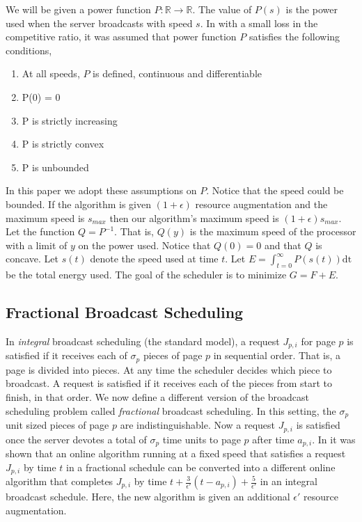 \documentclass[11pt]{article}
\newcommand{\eps}{\epsilon}
\newcommand{\dt}{\mathrm{dt}}
\begin{document}
We will be given a power function $P: \mathbb{R} \rightarrow \mathbb{R}$.  The value of $P(s)$ is the power used when the server broadcasts with speed $s$.  In \cite{BansalCP09,GuptaKP10} with a small loss in the competitive ratio, it was assumed that power function $P$ satisfies the following conditions,

\begin{enumerate}
\item At all speeds, $P$ is defined, continuous and differentiable

\item  P(0) = 0

\item P is strictly increasing

\item P is strictly convex

\item P is unbounded

\end{enumerate}

In this paper we adopt these assumptions on $P$.  Notice that the speed could be bounded. If the algorithm is given $(1+\eps)$ resource augmentation and the maximum speed is $s_{max}$ then our algorithm's maximum speed is $(1+\eps)s_{max}$.  Let the function $Q= P^{-1}$.  That is, $Q(y)$ is the maximum speed of the processor with a limit of $y$ on the power used.  Notice that $Q(0)=0$ and that $Q$ is concave.  Let $s(t)$ denote the speed used at time $t$. Let $E = \int_{t=0}^\infty P(s(t))\dt$ be the total energy used.  The goal of the scheduler is to minimize $G= F+E$.

\subsection{Fractional Broadcast Scheduling}
In \emph{integral} broadcast scheduling (the standard model), a request $J_{p,i}$ for page $p$  is satisfied if it receives each of $\sigma_p$ pieces of page $p$ in sequential order.  That is, a page is divided into pieces.  At any time the scheduler decides which piece to broadcast.  A request is satisfied if it receives each of the pieces from start to finish, in that order.   We now define a different version of the broadcast scheduling problem called \emph{fractional} broadcast scheduling.  In this setting, the $\sigma_p$ unit sized pieces of page $p$ are indistinguishable.  Now a request $J_{p,i}$ is satisfied once the server devotes a total of $\sigma_p$ time units to page $p$ after time $a_{p,i}$.  In \cite{BansalKN09} it was shown that an online algorithm running at a fixed speed that satisfies a request $J_{p,i}$ by time $t$ in a fractional schedule can be converted into a different online algorithm that completes $J_{p,i}$ by time $t + \frac{3}{\eps'}(t- a_{p,i}) + \frac{5}{\eps'}$ in an integral broadcast schedule.  Here, the new algorithm is given an additional $\eps'$ resource augmentation.  
\end{document}
